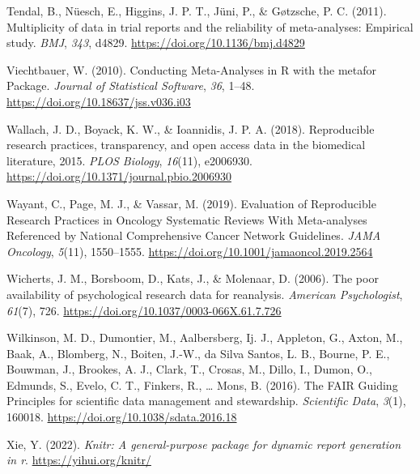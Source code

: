 \documentclass[
  ,apa7,floatsintext]{apa6}
\newlength{\cslhangindent}
\newlength{\cslentryspacingunit} %
\newenvironment{CSLReferences}[2] %
 {%
  \setlength{\parindent}{0pt}
  \ifodd #1
  \let\oldpar\par
  \def\par{\hangindent=\cslhangindent\oldpar}
  \fi
  \setlength{\parskip}{#2\cslentryspacingunit}
 }%
 {}
\begin{document}
\begin{CSLReferences}{1}{0}
\leavevmode{}%
Tendal, B., Nüesch, E., Higgins, J. P. T., Jüni, P., \& Gøtzsche, P. C. (2011). Multiplicity of data in trial reports and the reliability of meta-analyses: Empirical study. \emph{BMJ}, \emph{343}, d4829. \url{https://doi.org/10.1136/bmj.d4829}

\leavevmode{}%
Viechtbauer, W. (2010). Conducting {Meta-Analyses} in {R} with the metafor {Package}. \emph{Journal of Statistical Software}, \emph{36}, 1--48. \url{https://doi.org/10.18637/jss.v036.i03}

\leavevmode{}%
Wallach, J. D., Boyack, K. W., \& Ioannidis, J. P. A. (2018). Reproducible research practices, transparency, and open access data in the biomedical literature, 2015. \emph{PLOS Biology}, \emph{16}(11), e2006930. \url{https://doi.org/10.1371/journal.pbio.2006930}

\leavevmode{}%
Wayant, C., Page, M. J., \& Vassar, M. (2019). Evaluation of {Reproducible} {Research} {Practices} in {Oncology} {Systematic} {Reviews} {With} {Meta}-analyses {Referenced} by {National} {Comprehensive} {Cancer} {Network} {Guidelines}. \emph{JAMA Oncology}, \emph{5}(11), 1550--1555. \url{https://doi.org/10.1001/jamaoncol.2019.2564}

\leavevmode{}%
Wicherts, J. M., Borsboom, D., Kats, J., \& Molenaar, D. (2006). The poor availability of psychological research data for reanalysis. \emph{American Psychologist}, \emph{61}(7), 726. \url{https://doi.org/10.1037/0003-066X.61.7.726}

\leavevmode{}%
Wilkinson, M. D., Dumontier, M., Aalbersberg, Ij. J., Appleton, G., Axton, M., Baak, A., Blomberg, N., Boiten, J.-W., da Silva Santos, L. B., Bourne, P. E., Bouwman, J., Brookes, A. J., Clark, T., Crosas, M., Dillo, I., Dumon, O., Edmunds, S., Evelo, C. T., Finkers, R., \ldots{} Mons, B. (2016). The {FAIR Guiding Principles} for scientific data management and stewardship. \emph{Scientific Data}, \emph{3}(1), 160018. \url{https://doi.org/10.1038/sdata.2016.18}

\leavevmode{}%
Xie, Y. (2022). \emph{Knitr: A general-purpose package for dynamic report generation in r}. \url{https://yihui.org/knitr/}

\end{CSLReferences}
\end{document}
